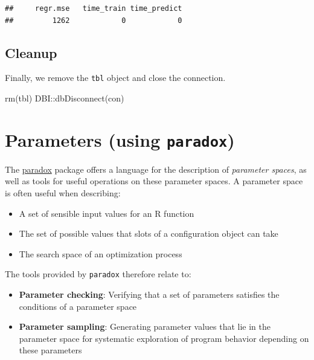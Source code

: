 \documentclass[
]{scrbook}
\newenvironment{Shaded}{\begin{snugshade}}{\end{snugshade}}
\newcommand{\FunctionTok}[1]{\textcolor[rgb]{0.00,0.00,0.00}{#1}}
\newcommand{\NormalTok}[1]{#1}
\newcommand{\SpecialCharTok}[1]{\textcolor[rgb]{0.00,0.00,0.00}{#1}}
\providecommand{\tightlist}{%
  \setlength{\itemsep}{0pt}\setlength{\parskip}{0pt}}
\renewenvironment{Shaded} {\begin{snugshade}\small} {\end{snugshade}}
\begin{document}
\begin{verbatim}
##     regr.mse   time_train time_predict 
##         1262            0            0
\end{verbatim}

\hypertarget{cleanup}{%
\subsection{Cleanup}\label{cleanup}}

Finally, we remove the \texttt{tbl} object and close the connection.

\begin{Shaded}
\begin{Highlighting}[]
\FunctionTok{rm}\NormalTok{(tbl)}
\NormalTok{DBI}\SpecialCharTok{::}\FunctionTok{dbDisconnect}\NormalTok{(con)}
\end{Highlighting}
\end{Shaded}

\hypertarget{paradox}{%
\section{\texorpdfstring{Parameters (using \texttt{paradox})}{Parameters (using paradox)}}\label{paradox}}

The \href{https://paradox.mlr-org.com}{paradox} package offers a language for the description of \emph{parameter spaces}, as well as tools for useful operations on these parameter spaces.
A parameter space is often useful when describing:

\begin{itemize}
\tightlist
\item
  A set of sensible input values for an R function
\item
  The set of possible values that slots of a configuration object can take
\item
  The search space of an optimization process
\end{itemize}

The tools provided by \texttt{paradox} therefore relate to:

\begin{itemize}
\tightlist
\item
  \textbf{Parameter checking}: Verifying that a set of parameters satisfies the conditions of a parameter space
\item
  \textbf{Parameter sampling}: Generating parameter values that lie in the parameter space for systematic exploration of program behavior depending on these parameters
\end{itemize}
\end{document}
